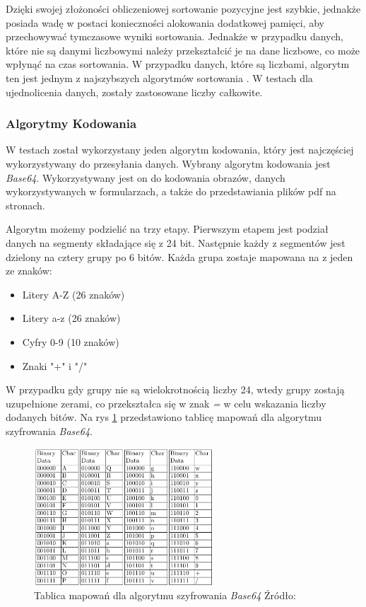 Dzięki swojej złożoności obliczeniowej sortowanie pozycyjne jest szybkie, jednakże posiada wadę w postaci konieczności alokowania dodatkowej pamięci, aby przechowywać tymczasowe wyniki sortowania. Jednakże w przypadku danych, które nie są danymi liczbowymi należy przekształcić je na dane liczbowe, co może wpłynąć na czas sortowania. W przypadku danych, które są liczbami, algorytm ten jest jednym z najszybszych algorytmów sortowania \cite{sorting}. W testach dla ujednolicenia danych, zostały zastosowane liczby całkowite.

\subsubsection{Algorytmy Kodowania}
W testach został wykorzystany jeden algorytm kodowania, który jest najczęściej wykorzystywany do przesyłania danych. Wybrany algorytm kodowania jest \textit{Base64}. Wykorzystywany jest on do kodowania obrazów, danych wykorzystywanych w formularzach, a także do przedstawiania plików pdf na stronach.

Algorytm możemy podzielić na trzy etapy. Pierwszym etapem jest podział danych na segmenty składające się z 24 bit. Następnie każdy z segmentów jest dzielony na cztery grupy po 6 bitów. Każda grupa zostaje mapowana na z jeden ze znaków:
\begin{itemize}
  \item Litery A-Z (26 znaków)
  \item Litery a-z (26 znaków)
  \item Cyfry 0-9 (10 znaków)
  \item Znaki "+" i "/"
\end{itemize}
W przypadku gdy grupy nie są wielokrotnością liczby 24, wtedy grupy zostają uzupełnione zerami, co przekształca się w znak \textit{=} w celu wskazania liczby dodanych bitów. Na rys \ref{fig:base64_mapping_table} przedstawiono tablicę mapowań dla algorytmu szyfrowania \textit{Base64}.

\begin{figure}[H]
  \centering
  \includegraphics[width=0.6\textwidth]{Figures/base64_mapping_table.png}
  \caption{Tablica mapowań dla algorytmu szyfrowania \textit{Base64} Źródło: \cite{cryptoeprint:2022/361}}
  \label{fig:base64_mapping_table}
\end{figure}


